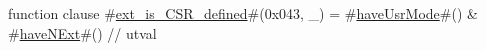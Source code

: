 function clause #\hyperref[sailRISCVzextzyiszyCSRzydefined]{ext\_is\_CSR\_defined}#(0x043, _) = #\hyperref[sailRISCVzhaveUsrMode]{haveUsrMode}#() & #\hyperref[sailRISCVzhaveNExt]{haveNExt}#() // utval
